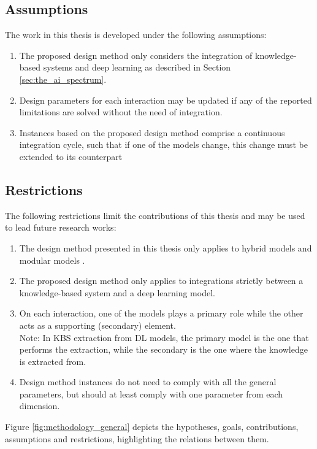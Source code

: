 \subsection{Assumptions}
The work in this thesis is developed under the following assumptions:
\begin{enumerate}[start=1,label={\bfseries A\arabic*:}]
    \item The proposed design method only considers the integration of knowledge-based systems and deep learning as described in Section \ref{sec:the_ai_spectrum}.
    \item Design parameters for each interaction may be updated if any of the reported limitations are solved without the need of integration.
    \item Instances based on the proposed design method comprise a continuous integration cycle, such that if one of the models change, this change must be extended to its counterpart
\end{enumerate}
\subsection{Restrictions}
The following restrictions limit the contributions of this thesis and may be used to lead future research works:
\begin{enumerate}[start=1,label={\bfseries R\arabic*:}]
    \item The design method presented in this thesis only applies to hybrid models \citep{hilario_overview_nodate} and modular models \citep{mcgarry_hybrid_1999}.
    \item The proposed design method only applies to integrations strictly between a knowledge-based system and a deep learning model. 
    \item On each interaction, one of the models plays a primary role while the other acts as a supporting (secondary) element.\\
    Note: In KBS extraction from DL models, the primary model is the one that performs the extraction, while the secondary is the one where the knowledge is extracted from.
    \item Design method instances do not need to comply with all the general parameters, but should at least comply with one parameter from each dimension. 
\end{enumerate}

Figure \ref{fig:methodology_general} depicts the hypotheses, goals, contributions, assumptions and restrictions, highlighting the relations between them. 

